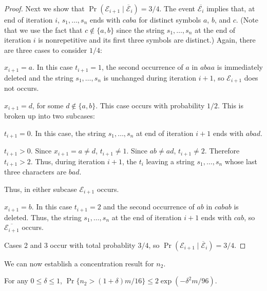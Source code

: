\documentclass{patmorin}
\begin{document}
\begin{proof}
  Next we show that $\Pr(\mathcal{E}_{i+1}\mid \overline{\mathcal{E}}_{i})=3/4$.
  The event $\overline{\mathcal{E}_i}$ implies that, at end of iteration $i$, $s_1,\ldots,s_n$ ends with $caba$ for distinct symbols $a$, $b$, and $c$.  (Note that we use the fact that $c\not\in\{a,b\}$ since the string $s_1,\ldots,s_n$ at the end of iteration $i$ is nonrepetitive and its first three symbols are distinct.)  Again, there are three cases to consider $1/4$:
  \begin{compactenum}
    \item $x_{i+1}=a$.  In this case $t_{i+1}=1$, the second occurrence of $a$ in $abaa$ is immediately deleted and the string $s_1,\ldots,s_n$ is unchanged during iteration $i+1$, so $\mathcal{E}_{i+1}$ does not occurs.
    
    \item $x_{i+1}=d$, for some $d\not\in\{a,b\}$.  This case occurs with probability $1/2$.  This is broken up into two subcases:
    \begin{compactenum}
      \item $t_{i+1}=0$.  In this case, the string $s_1,\ldots,s_n$ at end of iteration $i+1$ ends with $abad$.
      \item $t_{i+1}>0$.  Since $x_{i+1}=a\neq d$, $t_{i+1}\neq 1$.  Since $ab\neq ad$, $t_{i+1}\neq 2$.  Therefore $t_{i+1}>2$.  Thus, during iteration $i+1$, the $t_{i}$ leaving a string $s_1,\ldots,s_n$ whose last three characters are $bad$.
    \end{compactenum}
    Thus, in either subcase $\mathcal{E}_{i+1}$ occurs.
    
    \item $x_{i+1}=b$.  In this case $t_{i+1}=2$ and the second occurrence of $ab$ in $cabab$ is deleted. Thus, the string $s_1,\ldots,s_n$ at the end of iteration $i+1$ ends with $cab$, so $\overline{\mathcal{E}_{i+1}}$ occurs.
  \end{compactenum}
  Cases 2 and 3 occur with total probablity $3/4$, so $\Pr(\mathcal{E}_{i+1}\mid \overline{\mathcal{E}}_{i})=3/4$.
\end{proof}

We can now establish a concentration result for $n_2$.

\begin{lem}
  For any $0\le\delta\le 1$, $\Pr\{n_2 > (1+\delta)m/16\} \le 2\exp(-\delta^2 m/96)$.
\end{lem}
\end{document}
